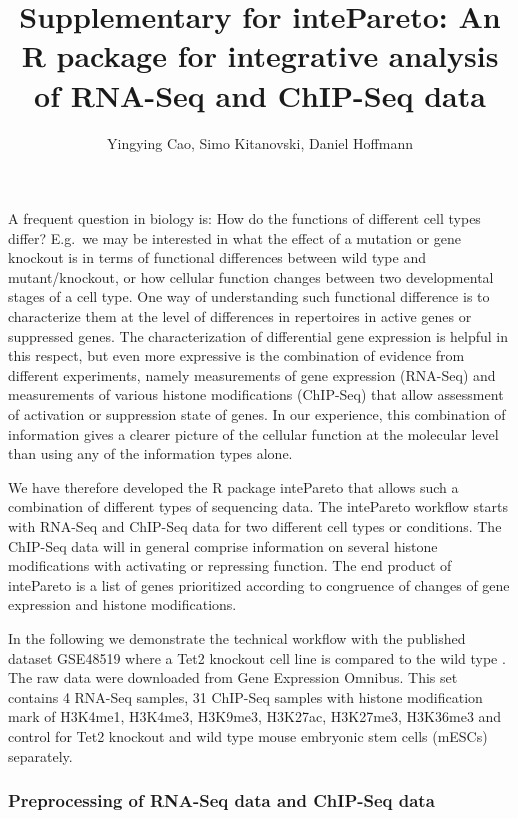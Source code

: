 \documentclass[10pt,]{article}
\title{Supplementary for intePareto: An R package for integrative analysis of
RNA-Seq and ChIP-Seq data}
\author{Yingying Cao, Simo Kitanovski, Daniel Hoffmann}
\date{}
\begin{document}
\maketitle

A frequent question in biology is: How do the functions of different
cell types differ? E.g.~we may be interested in what the effect of a
mutation or gene knockout is in terms of functional differences between
wild type and mutant/knockout, or how cellular function changes between
two developmental stages of a cell type. One way of understanding such
functional difference is to characterize them at the level of
differences in repertoires in active genes or suppressed genes. The
characterization of differential gene expression is helpful in this
respect, but even more expressive is the combination of evidence from
different experiments, namely measurements of gene expression (RNA-Seq)
and measurements of various histone modifications (ChIP-Seq) that allow
assessment of activation or suppression state of genes. In our
experience, this combination of information gives a clearer picture of
the cellular function at the molecular level than using any of the
information types alone.

We have therefore developed the R package intePareto that allows such a
combination of different types of sequencing data. The intePareto
workflow starts with RNA-Seq and ChIP-Seq data for two different cell
types or conditions. The ChIP-Seq data will in general comprise
information on several histone modifications with activating or
repressing function. The end product of intePareto is a list of genes
prioritized according to congruence of changes of gene expression and
histone modifications.

In the following we demonstrate the technical workflow with the
published dataset GSE48519 where a Tet2 knockout cell line is compared
to the wild type \autocite{hon2014}. The raw data were downloaded from
Gene Expression Omnibus. This set contains 4 RNA-Seq samples, 31
ChIP-Seq samples with histone modification mark of H3K4me1, H3K4me3,
H3K9me3, H3K27ac, H3K27me3, H3K36me3 and control for Tet2 knockout and
wild type mouse embryonic stem cells (mESCs) separately.

\hypertarget{preprocessing-of-rna-seq-data-and-chip-seq-data}{%
\subsubsection{Preprocessing of RNA-Seq data and ChIP-Seq
data}\label{preprocessing-of-rna-seq-data-and-chip-seq-data}}
\end{document}
